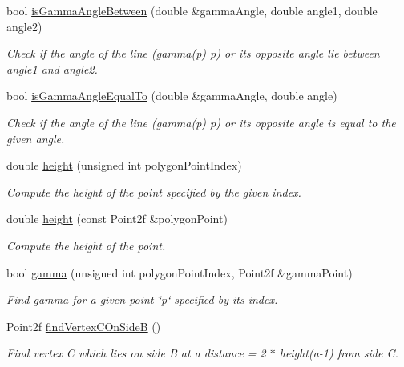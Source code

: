 \begin{DoxyCompactItemize}
bool \hyperlink{classmultiscale_1_1MinEnclosingTriangleFinder_a98d91069c4e7fae9f68f0af8be5e5487}{is\-Gamma\-Angle\-Between} (double \&gamma\-Angle, double angle1, double angle2)
\begin{DoxyCompactList}\small\item\em Check if the angle of the line (gamma(p) p) or its opposite angle lie between angle1 and angle2. \end{DoxyCompactList}\item 
bool \hyperlink{classmultiscale_1_1MinEnclosingTriangleFinder_a3690d470807b2d5d893988370099f283}{is\-Gamma\-Angle\-Equal\-To} (double \&gamma\-Angle, double angle)
\begin{DoxyCompactList}\small\item\em Check if the angle of the line (gamma(p) p) or its opposite angle is equal to the given angle. \end{DoxyCompactList}\item 
double \hyperlink{classmultiscale_1_1MinEnclosingTriangleFinder_a4fd0fdc0ccc472a2d15c8d001f65d0f9}{height} (unsigned int polygon\-Point\-Index)
\begin{DoxyCompactList}\small\item\em Compute the height of the point specified by the given index. \end{DoxyCompactList}\item 
double \hyperlink{classmultiscale_1_1MinEnclosingTriangleFinder_a9507a3196dd16613bf828d04f196b9db}{height} (const Point2f \&polygon\-Point)
\begin{DoxyCompactList}\small\item\em Compute the height of the point. \end{DoxyCompactList}\item 
bool \hyperlink{classmultiscale_1_1MinEnclosingTriangleFinder_a800413be1e1567d986a92fac4a6b937e}{gamma} (unsigned int polygon\-Point\-Index, Point2f \&gamma\-Point)
\begin{DoxyCompactList}\small\item\em Find gamma for a given point \char`\"{}p\char`\"{} specified by its index. \end{DoxyCompactList}\item 
Point2f \hyperlink{classmultiscale_1_1MinEnclosingTriangleFinder_ab0b488d2d67f2d22077777eebc292c1a}{find\-Vertex\-C\-On\-Side\-B} ()
\begin{DoxyCompactList}\small\item\em Find vertex C which lies on side B at a distance = 2 $\ast$ height(a-\/1) from side C. \end{DoxyCompactList}\item 

\end{DoxyCompactItemize}
